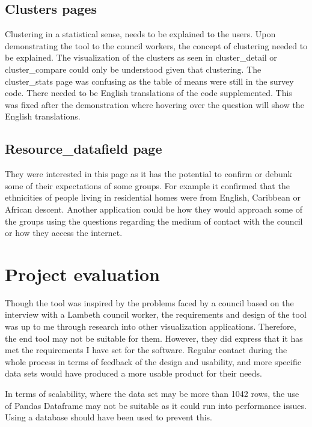 \subsection{Clusters pages}

Clustering in a statistical sense, needs to be explained to the users. Upon demonstrating the tool to the council workers, the concept of clustering needed to be explained. The visualization of the clusters as seen in cluster\_detail or cluster\_compare could only be understood given that clustering.
The cluster\_stats page was confusing as the table of means were still in the survey code. There needed to be English translations of the code supplemented. This was fixed after the demonstration where hovering over the question will show the English translations.

\subsection{Resource\_datafield page}
They were interested in this page as it has the potential to confirm or debunk some of their expectations of some groups. For example it confirmed that the ethnicities of people living in residential homes were from English, Caribbean or African descent. Another application could be how they would approach some of the groups using the questions regarding the medium of contact with the council or how they access the internet.

\section{Project evaluation}

Though the tool was inspired by the problems faced by a council based on the interview with a Lambeth council worker, the requirements and design of the tool was up to me through research into other visualization applications. Therefore, the end tool may not be suitable for them. However, they did express that it has met the requirements I have set for the software. Regular contact during the whole process in terms of feedback of the design and usability, and more specific data sets would have produced a more usable product for their needs.\par

In terms of scalability, where the data set may be more than 1042 rows, the use of Pandas Dataframe may not be suitable as it could run into performance issues. Using a database should have been used to prevent this.
